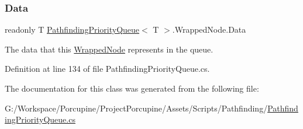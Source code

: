 \subsubsection{\texorpdfstring{Data}{Data}}
{\footnotesize\ttfamily readonly T \hyperlink{class_pathfinding_priority_queue}{Pathfinding\+Priority\+Queue}$<$ T $>$.Wrapped\+Node.\+Data}



The data that this \hyperlink{class_pathfinding_priority_queue_1_1_wrapped_node}{Wrapped\+Node} represents in the queue. 



Definition at line 134 of file Pathfinding\+Priority\+Queue.\+cs.



The documentation for this class was generated from the following file\+:\begin{DoxyCompactItemize}
\item 
G\+:/\+Workspace/\+Porcupine/\+Project\+Porcupine/\+Assets/\+Scripts/\+Pathfinding/\hyperlink{_pathfinding_priority_queue_8cs}{Pathfinding\+Priority\+Queue.\+cs}\end{DoxyCompactItemize}

